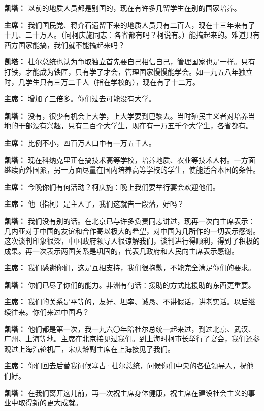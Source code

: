 \begin{duihua}
\item[\textbf{凯塔：}] 以前的地质人员都是别国的，现在有许多几留学生在别的国家培养。

\item[\textbf{主席：}] 我们国民党、蒋介石遗留下来的地质人员只有二百人，现在十三年来有了十几、二十万人。（问柯庆施同志：各省都有吗？柯说有。）能搞起来的。难道只有西方国家能搞，我们就不能搞起来吗？

\item[\textbf{凯塔：}] 杜尔总统也认为争取独立首先要自己相信自己，管理国家也是一样。只有打铁，才能成为铁匠，只有学了才会，管理国家慢慢能学会。如一九五八年独立时，几学生只有三万二千人（指在学校的），现在有了十二万。

\item[\textbf{主席：}] 增加了三倍多。你们过去可能没有大学。

\item[\textbf{凯塔：}] 没有，很少有机会上大学，上大学要到巴黎去。当时殖民主义者对培养当地的干部没有兴趣，只有二百个大学生，现在有一万五千个大学生，各省都有。

\item[\textbf{主席：}] 比例不小，四百万人口中有一万五千人。

\item[\textbf{凯塔：}] 现在科纳克里正在搞技术高等学校，培养地质、农业等技术人材。一方面继续向外国派，另一方面尽量在国内培养高等学校的学生，使能适合本国的条件。

\item[\textbf{主席：}] 今晚你们有何活动？柯庆施：晚上我们要举行宴会欢迎他们。

\item[\textbf{主席：}] 他（指柯）是主人了，我们这就告一段落，好吗？

\item[\textbf{凯塔：}] 我们没有别的话。在北京已与许多负责同志讲过，现再一次向主席表示：几内亚对于中国的友谊和合作寄以极大的希望，对中国为几所作的一切表示感谢。这次谈判印象很深，中国政府领导人很谅解我们，谈判进行得顺利，得到了积极的成果。再一次表示两国关系是巩固的，代表几政府和人民向主席表示感谢。

\item[\textbf{主席：}] 我们感谢你们，这是互相支持，我们很抱歉，不能完全满足你们的要求。

\item[\textbf{凯塔：}] 你们已尽了你们的能力。非洲有句话：援助的方式比援助的东西更重要。

\item[\textbf{主席：}] 我们的关系是平等的，友好、坦率、诚恳、不讲假话，讲老实话。以后继续往来。你们来过中国吗？

\item[\textbf{凯塔：}] 他们都是第一次，我一九六〇年陪杜尔总统一起来过，到过北京、武汉、广州、上海等地。主席在北京接见过我们。到上海时柯市长举行了宴会，我们还参观过上海汽轮机厂，宋庆龄副主席在上海接见了我们。

\item[\textbf{主席：}] 你们回去后替我问候塞古·杜尔总统，问候你们中央的各位领导人，祝他们好。

\item[\textbf{凯塔：}] 在我们离开这儿前，再一次祝主席身体健康，祝主席在建设社会主义的事业中取得新的更大成就。
\end{duihua}